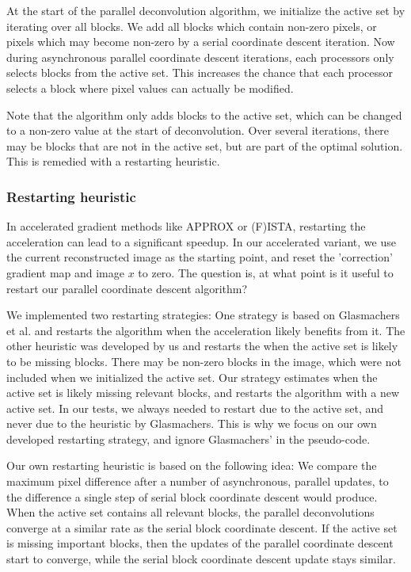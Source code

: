 At the start of the parallel deconvolution algorithm, we initialize the active set by iterating over all blocks. We add all blocks which contain non-zero pixels, or pixels which may become non-zero by a serial coordinate descent iteration. Now during asynchronous parallel coordinate descent iterations, each processors only selects blocks from the active set. This increases the chance that each processor selects a block where pixel values can actually be modified.

Note that the algorithm only adds blocks to the active set, which can be changed to a non-zero value at the start of deconvolution. Over several iterations, there may be blocks that are not in the active set, but are part of the optimal solution. This is remedied with a restarting heuristic.


\subsubsection{Restarting heuristic}
In accelerated gradient methods like APPROX or (F)ISTA, restarting the acceleration can lead to a significant speedup\cite{fercoq2016restarting}. In our accelerated variant, we use the current reconstructed image as the starting point, and reset the 'correction' gradient map and image $x$ to zero. The question is, at what point is it useful to restart our parallel coordinate descent algorithm?

We implemented two restarting strategies: One strategy is based on Glasmachers et al.\cite{glasmachers2014coordinate} and restarts the algorithm when the acceleration likely benefits from it. The other heuristic was developed by us and restarts the when the active set is likely to be missing blocks. There may be non-zero blocks in the image, which were not included when we initialized the active set. Our strategy estimates when the active set is likely missing relevant blocks, and restarts the algorithm with a new active set. In our tests, we always needed to restart due to the active set, and never due to the heuristic by Glasmachers. This is why we focus on our own developed restarting strategy, and ignore Glasmachers' in the pseudo-code.

Our own restarting heuristic is based on the following idea: We compare the maximum pixel difference after a number of asynchronous, parallel updates, to the difference a single step of serial block coordinate descent would produce. When the active set contains all relevant blocks, the parallel deconvolutions converge at a similar rate as the serial block coordinate descent. If the active set is missing important blocks, then the updates of the parallel coordinate descent start to converge, while the serial block coordinate descent update stays similar.

